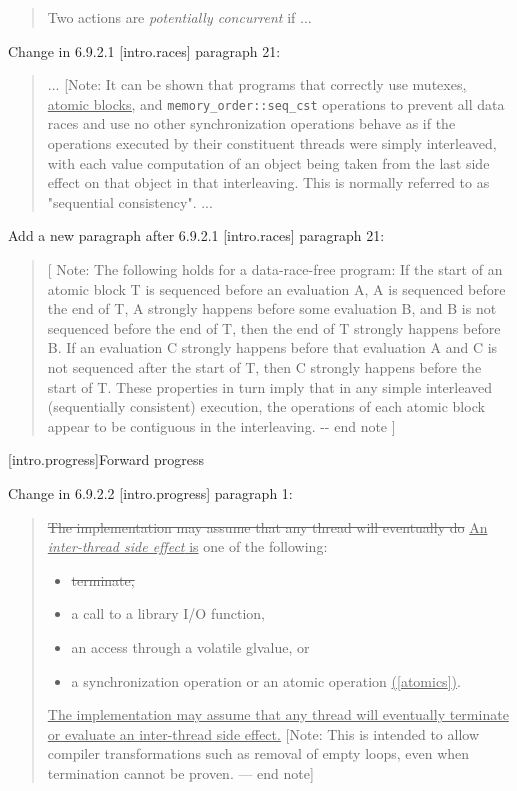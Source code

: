 \begin{quote}
Two actions are \emph{potentially concurrent} if ...
\end{quote}

\pnum
Change in 6.9.2.1 {[}intro.races{]} paragraph 21:

\begin{quote}
... {[}Note: It can be shown that programs that correctly use
mutexes\uline{, atomic blocks,} and \texttt{memory\_order::seq\_cst}
operations to prevent all data races and use no other synchronization
operations behave as if the operations executed by their constituent
threads were simply interleaved, with each value computation of an
object being taken from the last side effect on that object in that
interleaving. This is normally referred to as "sequential consistency".
...
\end{quote}

\pnum
Add a new paragraph after 6.9.2.1 {[}intro.races{]} paragraph 21:

\begin{quote}
{[} Note: The following holds for a data-race-free program: If the start
of an atomic block T is sequenced before an evaluation A, A is sequenced
before the end of T, A strongly happens before some evaluation B, and B
is not sequenced before the end of T, then the end of T strongly happens
before B. If an evaluation C strongly happens before that evaluation A
and C is not sequenced after the start of T, then C strongly happens
before the start of T. These properties in turn imply that in any simple
interleaved (sequentially consistent) execution, the operations of each
atomic block appear to be contiguous in the interleaving. -\/- end note
{]}
\end{quote}

[intro.progress]{Forward progress} 

\pnum
Change in 6.9.2.2 {[}intro.progress{]} paragraph 1:

\begin{quote}
\sout{The implementation may assume that any thread will eventually do}
\uline{An \emph{inter-thread side effect} is} one of the following:

\begin{itemize}
\tightlist
\item
  \sout{terminate,}
\item
  a call to a library I/O function,
\item
  an access through a volatile glvalue, or
\item
  a synchronization operation or an atomic operation
  \uline{({[}atomics{]})}.
\end{itemize}

\uline{The implementation may assume that any thread will eventually
terminate or evaluate an inter-thread side effect.} {[}Note: This is
intended to allow compiler transformations such as removal of empty
loops, even when termination cannot be proven. --- end note{]}
\end{quote}

